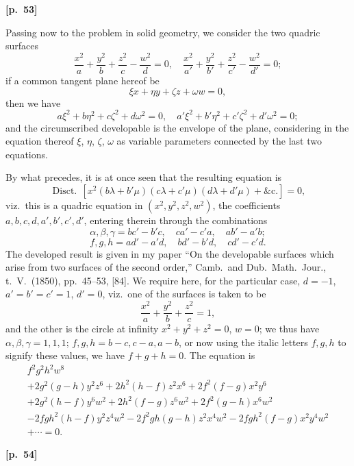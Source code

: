 \documentclass[11pt,a4paper]{article}
\theoremstyle{plain}
\DeclareMathOperator{\Disc}{Disct.}
\begin{document}
\vspace{0.5em}
\noindent\textbf{[p.\ 53]}

Passing now to the problem in solid geometry, we consider the two quadric surfaces
$$
\frac{x^2}{a} + \frac{y^2}{b} + \frac{z^2}{c} - \frac{w^2}{d} = 0, \quad \frac{x^2}{a'} + \frac{y^2}{b'} + \frac{z^2}{c'} - \frac{w^2}{d'} = 0;
$$
if a common tangent plane hereof be
$$
\xi x + \eta y + \zeta z + \omega w = 0,
$$
then we have
$$
a\xi^2 + b\eta^2 + c\zeta^2 + d\omega^2 = 0, \quad a'\xi^2 + b'\eta^2 + c'\zeta^2 + d'\omega^2 = 0;
$$
and the circumscribed developable is the envelope of the plane, considering in the equation thereof $\xi$, $\eta$, $\zeta$, $\omega$ as variable parameters connected by the last two equations.

By what precedes, it is at once seen that the resulting equation is
$$
\Disc\, [x^2(b\lambda + b'\mu)(c\lambda + c'\mu)(d\lambda + d'\mu) + \text{\&c.}] = 0,
$$
viz.\ this is a quadric equation in $(x^2, y^2, z^2, w^2)$, the coefficients $a, b, c, d, a', b', c', d'$, entering therein through the combinations
$$
\alpha, \beta, \gamma = bc' - b'c, \quad ca' - c'a, \quad ab' - a'b;
$$
$$
f, g, h = ad' - a'd, \quad bd' - b'd, \quad cd' - c'd.
$$
The developed result is given in my paper ``On the developable surfaces which arise from two surfaces of the second order,'' Camb.\ and Dub.\ Math.\ Jour., t.\ V.\ (1850), pp.\ 45--53, [84]. We require here, for the particular case, $d = -1$, $a' = b' = c' = 1$, $d' = 0$, viz.\ one of the surfaces is taken to be
$$
\frac{x^2}{a} + \frac{y^2}{b} + \frac{z^2}{c} = 1,
$$
and the other is the circle at infinity $x^2 + y^2 + z^2 = 0$, $w = 0$; we thus have $\alpha, \beta, \gamma = 1, 1, 1$; $f, g, h = b - c, c - a, a - b$, or now using the italic letters $f, g, h$ to signify these values, we have $f + g + h = 0$. The equation is
\begin{multline*}
f^2 g^2 h^2 w^8 \\
+ 2g^2(g - h)y^2 z^6 + 2h^2(h - f)z^2 x^6 + 2f^2(f - g)x^2 y^6 \\
+ 2g^2(h - f)y^6 w^2 + 2h^2(f - g)z^6 w^2 + 2f^2(g - h)x^6 w^2 \\
- 2fgh^2(h - f)y^2 z^4 w^2 - 2f^2 g h(g - h)z^2 x^4 w^2 - 2fgh^2(f - g)x^2 y^4 w^2 \\
+ \cdots = 0.
\end{multline*}

\vspace{0.5em}
\noindent\textbf{[p.\ 54]}
\end{document}
